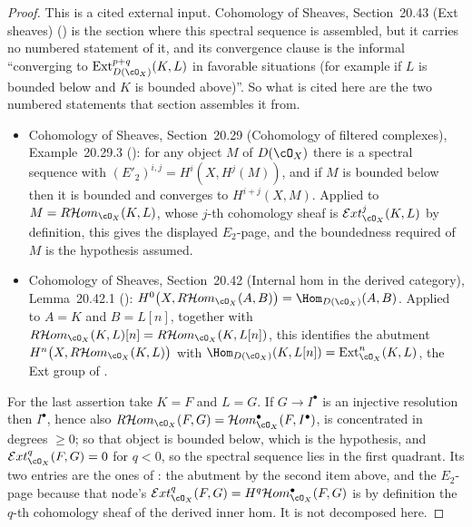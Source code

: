\begin{proof}
This is a cited external input.  Cohomology of Sheaves, Section~20.43 (Ext
sheaves) () is the section where this spectral sequence is
assembled, but it carries no numbered statement of it, and its convergence
clause is the informal ``converging to
$\operatorname{Ext}^{p+q}_{D(\cO_X)}(K,L)$ in favorable situations (for example
if $L$ is bounded below and $K$ is bounded above)''.  So what is cited here are
the two numbered statements that section assembles it from.
\begin{itemize}
\item Cohomology of Sheaves, Section~20.29 (Cohomology of filtered complexes),
Example~20.29.3 (): for any object $M$ of $D(\cO_X)$ there
is a spectral sequence with $(E'_2)^{i,j}=H^i(X,H^j(M))$, and if $M$ is bounded
below then it is bounded and converges to $H^{i+j}(X,M)$.  Applied to
$M=R\mathcal{H}om_{\cO_X}(K,L)$, whose $j$-th cohomology sheaf is
$\mathcal{E}xt^{j}_{\cO_X}(K,L)$ by definition, this gives the displayed
$E_2$-page, and the boundedness required of $M$ is the hypothesis assumed.
\item Cohomology of Sheaves, Section~20.42 (Internal hom in the derived
category), Lemma~20.42.1 ():
$H^0\bigl(X,R\mathcal{H}om_{\cO_X}(A,B)\bigr)=\Hom_{D(\cO_X)}(A,B)$.  Applied
to $A=K$ and $B=L[n]$, together with
$R\mathcal{H}om_{\cO_X}(K,L)[n]=R\mathcal{H}om_{\cO_X}(K,L[n])$, this
identifies the abutment $H^{n}\bigl(X,R\mathcal{H}om_{\cO_X}(K,L)\bigr)$ with
$\Hom_{D(\cO_X)}(K,L[n])=\operatorname{Ext}^{n}_{\cO_X}(K,L)$, the Ext group of
.
\end{itemize}
For the last assertion take $K=F$ and $L=G$.  If $G\to I^\bullet$ is an
injective resolution then $I^\bullet$, hence also
$R\mathcal{H}om_{\cO_X}(F,G)=\mathcal{H}om^{\bullet}_{\cO_X}(F,I^\bullet)$, is
concentrated in degrees $\ge0$; so that object is bounded below, which is the
hypothesis, and $\mathcal{E}xt^{q}_{\cO_X}(F,G)=0$ for $q<0$, so the spectral
sequence lies in the first quadrant.  Its two entries are the ones of
: the abutment by the second item above, and the $E_2$-page
because that node's $\mathcal{E}xt^{q}_{\cO_X}(F,G)
=H^q\mathcal{H}om^{\bullet}_{\cO_X}(F,G)$ is by definition the $q$-th
cohomology sheaf of the derived inner hom.  It is not decomposed here.
\end{proof}

